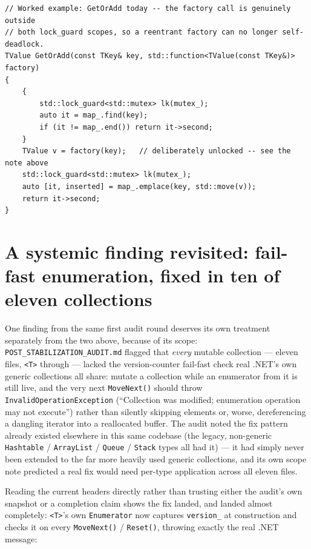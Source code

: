 \begin{lstlisting}
// Worked example: GetOrAdd today -- the factory call is genuinely outside
// both lock_guard scopes, so a reentrant factory can no longer self-deadlock.
TValue GetOrAdd(const TKey& key, std::function<TValue(const TKey&)> factory)
{
    {
        std::lock_guard<std::mutex> lk(mutex_);
        auto it = map_.find(key);
        if (it != map_.end()) return it->second;
    }
    TValue v = factory(key);   // deliberately unlocked -- see the note above
    std::lock_guard<std::mutex> lk(mutex_);
    auto [it, inserted] = map_.emplace(key, std::move(v));
    return it->second;
}
\end{lstlisting}

\section{A systemic finding revisited: fail-fast enumeration, fixed in ten of eleven collections}

One finding from the same first audit round deserves its own treatment separately from the two
above, because of its scope: \texttt{POST\_STABILIZATION\_AUDIT.md} flagged that \emph{every}
 mutable collection --- eleven files,
\allowbreak{}\texttt{<T>} through  --- lacked the
version-counter fail-fast check real .NET's own generic collections all share: mutate a
collection while an enumerator from it is still live, and the very next \texttt{MoveNext()}
should throw \texttt{InvalidOperationException} (``Collection was modified; enumeration
operation may not execute'') rather than silently skipping elements or, worse, dereferencing a
dangling iterator into a reallocated buffer. The audit noted the fix pattern already existed
elsewhere in this same codebase (the legacy, non-generic \texttt{Hashtable} / \texttt{ArrayList}
/ \texttt{Queue} / \texttt{Stack} types all had it) --- it had simply never been extended to the
far more heavily used generic collections, and its own scope note predicted a real fix would
need per-type application across all eleven files.

Reading the current headers directly rather than trusting either the audit's own snapshot or a
completion claim shows the fix landed, and landed almost completely: \allowbreak{}
\texttt{<T>}'s own \texttt{Enumerator} now captures \texttt{version\_} at construction and checks
it on every \texttt{MoveNext()} / \texttt{Reset()}, throwing exactly the real .NET message:

